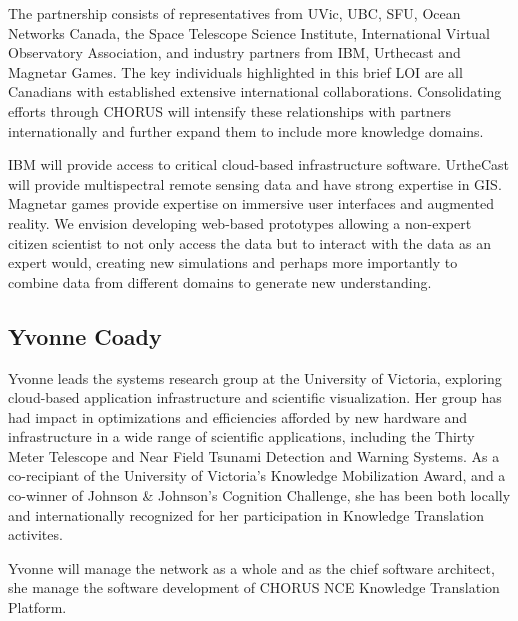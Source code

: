 

The partnership consists of representatives from UVic, UBC, SFU,
Ocean Networks Canada, the Space Telescope Science
Institute, International Virtual Observatory Association, and industry
partners from IBM, Urthecast and Magnetar Games.  The key individuals
highlighted in this brief LOI are all Canadians with established
extensive international collaborations.  Consolidating efforts through
CHORUS will intensify these relationships with partners
internationally and further expand them to include more knowledge
domains.


IBM will provide access to critical cloud-based infrastructure software.  UrtheCast will provide multispectral remote sensing data and have
strong expertise in GIS.  Magnetar games provide expertise on
immersive user interfaces and augmented reality.  We envision
developing web-based prototypes allowing a non-expert citizen
scientist to not only access the data but to interact with the data as
an expert would, creating new simulations and perhaps more importantly
to combine data from different domains to generate new understanding.

\subsection*{Yvonne Coady} 

Yvonne leads the systems research group at the University of Victoria,
exploring cloud-based application infrastructure and scientific
visualization.  Her group has had impact in optimizations and
efficiencies afforded by new hardware and infrastructure in a wide
range of scientific applications, including the Thirty Meter Telescope
and Near Field Tsunami Detection and Warning Systems.  As a
co-recipiant of the University of Victoria's Knowledge Mobilization
Award, and a co-winner of Johnson \& Johnson's Cognition Challenge, she
has been both locally and internationally recognized for her
participation in Knowledge Translation activites.

Yvonne will manage the network as a whole and as the chief software
architect, she manage the software development of CHORUS NCE Knowledge
Translation Platform.


